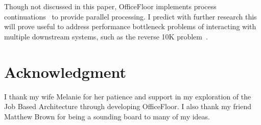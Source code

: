 \documentclass[conference]{ieee/IEEEtran}
\begin{document}
Though not discussed in this paper, OfficeFloor implements process
continuations~\cite{process-continuation} to provide parallel processing.  I
predict with further research this will prove useful to address performance
bottleneck problems of interacting with multiple downstream systems, such as the
reverse 10K problem~\cite{reverse-ten-k-problem}.









\section*{Acknowledgment} I thank my wife Melanie for her patience and support
in my exploration of the Job Based Architecture through developing OfficeFloor. 
I also thank my friend Matthew Brown for being a sounding board to many of my
ideas.



%
%

\end{document}
